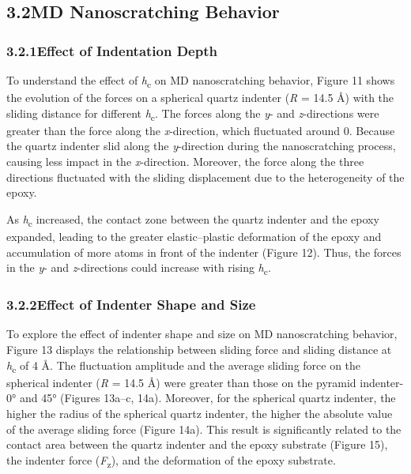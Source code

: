 \documentclass{article}
\begin{document}
\subsection*{3.2\quad MD Nanoscratching Behavior}

\subsubsection*{3.2.1\quad Effect of Indentation Depth}

To understand the effect of \emph{h}\textsubscript{c} on MD nanoscratching behavior, Figure 11 shows the evolution of the forces on a spherical quartz indenter (\emph{R} = 14.5 Å) with the sliding distance for different \emph{h}\textsubscript{c}. The forces along the \emph{y}- and \emph{z}-directions were greater than the force along the \emph{x}-direction, which fluctuated around 0. Because the quartz indenter slid along the \emph{y}-direction during the nanoscratching process, causing less impact in the \emph{x}-direction. Moreover, the force along the three directions fluctuated with the sliding displacement due to the heterogeneity of the epoxy.

As \emph{h}\textsubscript{c} increased, the contact zone between the quartz indenter and the epoxy expanded, leading to the greater elastic–plastic deformation of the epoxy and accumulation of more atoms in front of the indenter (Figure 12). Thus, the forces in the \emph{y}- and \emph{z}-directions could increase with rising \emph{h}\textsubscript{c}.

\subsubsection*{3.2.2\quad Effect of Indenter Shape and Size}

To explore the effect of indenter shape and size on MD nanoscratching behavior, Figure 13 displays the relationship between sliding force and sliding distance at \emph{h}\textsubscript{c} of 4 Å. The fluctuation amplitude and the average sliding force on the spherical indenter (\emph{R} = 14.5 Å) were greater than those on the pyramid indenter-0° and 45° (Figures 13a–c, 14a). Moreover, for the spherical quartz indenter, the higher the radius of the spherical quartz indenter, the higher the absolute value of the average sliding force (Figure 14a). This result is significantly related to the contact area between the quartz indenter and the epoxy substrate (Figure 15), the indenter force (\emph{F}\textsubscript{z}), and the deformation of the epoxy substrate.
\end{document}
